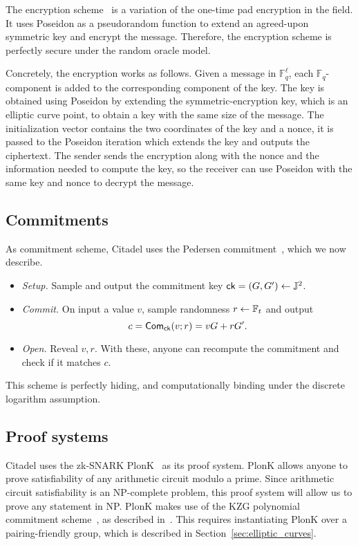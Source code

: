 The encryption scheme~\cite{duskDmitry} is a variation of the one-time pad encryption in the field. It uses Poseidon as a pseudorandom function to extend an agreed-upon symmetric key and encrypt the message. Therefore, the encryption scheme is perfectly secure under the random oracle model. 

Concretely, the encryption works as follows. Given a message in $\mathbb{F}_q^{\ell}$, each $\mathbb{F}_q$-component is added to  the corresponding component of the key. The key is obtained using Poseidon by extending the symmetric-encryption key, which is an elliptic curve point, 
to obtain a key with the same size of the message. The initialization vector contains the two coordinates of the key and a nonce, it is passed to the Poseidon iteration which extends the key and outputs the ciphertext. The sender sends the encryption along with the nonce and the information needed to compute the key, so the receiver can use Poseidon with the same key and nonce to decrypt the message.

\subsection{Commitments}\label{sec:commitments}

As commitment scheme, Citadel uses the Pedersen commitment~\cite{pedersen1991non}, which we now describe. 

\begin{itemize}
	\item \emph{Setup.} Sample and output the commitment key $\mathsf{ck}= (G,G')\gets\mathbb{J}^2$.
	\item \emph{Commit.} On input a value $v$, sample randomness $r\gets\mathbb{F}_t$ and output
	\[c = \mathsf{Com}_{\mathsf{ck}}(v;r)=vG+rG'.\]
	\item \emph{Open.} Reveal $v,r$. With these, anyone can recompute the commitment and check if it matches $c$.
\end{itemize}

This scheme is perfectly hiding, and computationally binding under the discrete logarithm assumption.

\subsection{Proof systems}\label{sec:proof_system}

Citadel uses the zk-SNARK PlonK~\cite{gabizon2019plonk} as its proof system. PlonK allows anyone to prove satisfiability of any arithmetic circuit modulo a prime. Since arithmetic circuit satisfiability is an NP-complete problem, this proof system will allow us to prove any statement in NP. 
%
PlonK makes use of the KZG polynomial commitment scheme~\cite{kate2010constant}, as described in~\cite{gabizon2019plonk}. This requires instantiating PlonK over a pairing-friendly group, which is described in Section~\ref{sec:elliptic_curves}.

